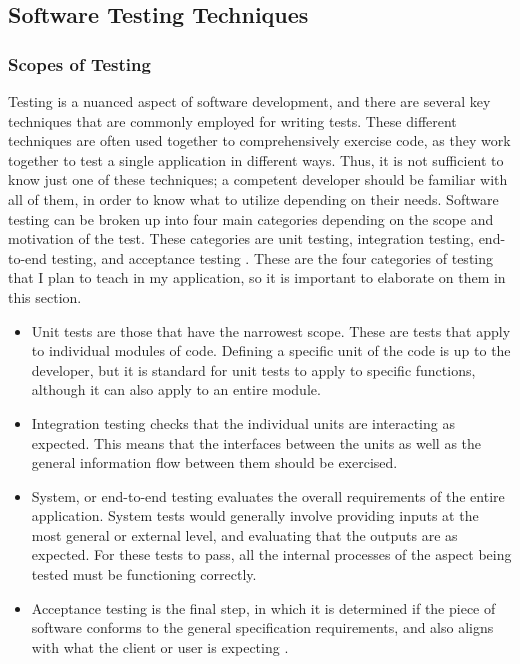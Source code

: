 \documentclass[10pt,twocolumn]{article}
\begin{document}
\subsection{Software Testing Techniques}

\subsubsection{Scopes of Testing}

Testing is a nuanced aspect of software development, and there are several key techniques that are commonly employed for 
writing tests. These different techniques are often used together to comprehensively exercise code, as they work 
together to test a single application in different ways. Thus, it is not sufficient to know just one of these 
techniques; a competent developer should be familiar with all of them, in order to know what to utilize depending on 
their needs. Software testing can be broken up into four main categories depending on the scope and motivation of the 
test. These categories are unit testing, integration testing, end-to-end testing, and acceptance testing 
\cite{Luo2001Article}. These are the four categories of testing that I plan to teach in my application, so it is 
important to elaborate on them in this section. 

\begin{itemize}
    \item{Unit tests are those that have the narrowest 
    scope. These are tests that apply to individual modules of code. Defining a specific unit of the code is up to the 
    developer, but it is standard for unit tests to apply to specific functions, although it can also apply to an entire 
    module.}
    \item{Integration testing checks that the individual units are interacting as expected. This means that the interfaces 
    between the units as well as the general information flow between them should be exercised.}
    \item{System, or end-to-end 
    testing evaluates the overall requirements of the entire application. System tests would generally involve providing 
    inputs at the most general or external level, and evaluating that the outputs are as expected. For these tests to pass, 
    all the internal processes of the aspect being tested must be functioning correctly.}
    \item{Acceptance testing is the final 
    step, in which it is determined if the piece of software conforms to the general specification requirements, and also 
    aligns with what the client or user is expecting \cite{Luo2001Article}. }
\end{itemize}
   
\end{document}
